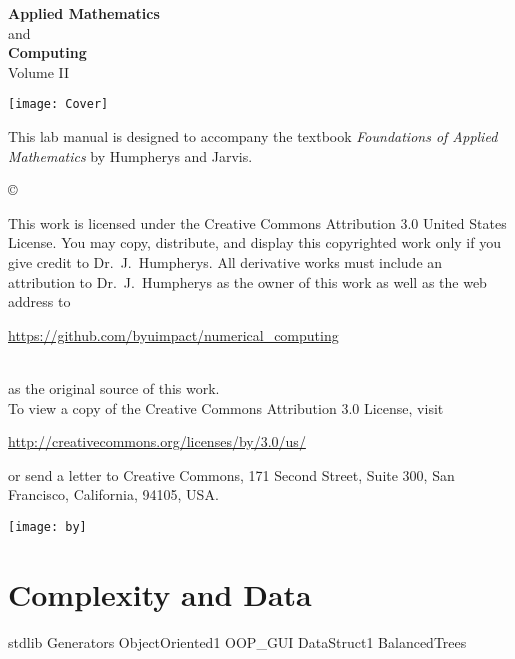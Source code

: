 \documentclass[nociteref]{SIAM-GH-book}
\begin{document}
\thispagestyle{empty}

\begin{center}
{\huge \bf Applied Mathematics} \\ and \\ {\huge \bf Computing} \\
\vspace{5mm}
{\Large Volume II}
\vspace{20mm}

\texttt{[image: Cover]}
\end{center}
\frontmatter




\begin{thepreface}
This lab manual is designed to accompany the textbook \emph{Foundations of Applied Mathematics} by Humpherys and Jarvis.

\vfill
\copyright{This work is licensed under the Creative Commons Attribution 3.0 United States
License.  You may copy, distribute, and display this copyrighted work only if you give
credit to Dr.~J.~Humpherys. All derivative works must include an attribution to Dr.~J.~Humpherys as the owner of this work as well as the web address to
\\\centerline{\url{https://github.com/byuimpact/numerical_computing}}\\ as the original source of
this
work.\\To view a copy of the Creative Commons Attribution 3.0 License,
visit\\\centerline{\url{http://creativecommons.org/licenses/by/3.0/us/}} or send a letter to
Creative Commons, 171 Second Street, Suite 300, San Francisco, California, 94105, USA.}

\vfill
\centering\texttt{[image: by]}
\vfill
\end{thepreface}

\setcounter{tocdepth}{1}
\tableofcontents

\mainmatter

\part{Complexity and Data}
{stdlib}
{Generators}
{ObjectOriented1}
{OOP_GUI}
{DataStruct1}
{BalancedTrees}
\end{document}
